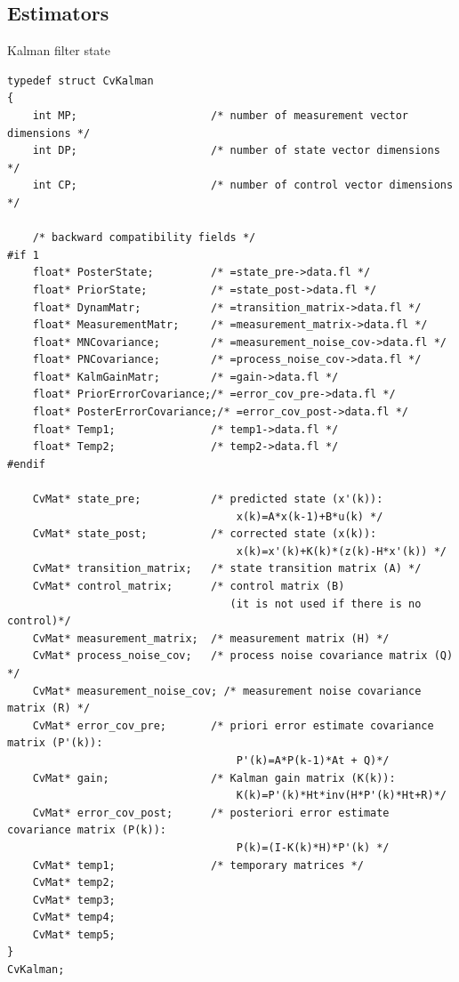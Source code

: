 \subsection{Estimators}

\label{CvKalman}

Kalman filter state

\begin{lstlisting}
typedef struct CvKalman
{
    int MP;                     /* number of measurement vector dimensions */
    int DP;                     /* number of state vector dimensions */
    int CP;                     /* number of control vector dimensions */

    /* backward compatibility fields */
#if 1
    float* PosterState;         /* =state_pre->data.fl */
    float* PriorState;          /* =state_post->data.fl */
    float* DynamMatr;           /* =transition_matrix->data.fl */
    float* MeasurementMatr;     /* =measurement_matrix->data.fl */
    float* MNCovariance;        /* =measurement_noise_cov->data.fl */
    float* PNCovariance;        /* =process_noise_cov->data.fl */
    float* KalmGainMatr;        /* =gain->data.fl */
    float* PriorErrorCovariance;/* =error_cov_pre->data.fl */
    float* PosterErrorCovariance;/* =error_cov_post->data.fl */
    float* Temp1;               /* temp1->data.fl */
    float* Temp2;               /* temp2->data.fl */
#endif

    CvMat* state_pre;           /* predicted state (x'(k)):
                                    x(k)=A*x(k-1)+B*u(k) */
    CvMat* state_post;          /* corrected state (x(k)):
                                    x(k)=x'(k)+K(k)*(z(k)-H*x'(k)) */
    CvMat* transition_matrix;   /* state transition matrix (A) */
    CvMat* control_matrix;      /* control matrix (B)
                                   (it is not used if there is no control)*/
    CvMat* measurement_matrix;  /* measurement matrix (H) */
    CvMat* process_noise_cov;   /* process noise covariance matrix (Q) */
    CvMat* measurement_noise_cov; /* measurement noise covariance matrix (R) */
    CvMat* error_cov_pre;       /* priori error estimate covariance matrix (P'(k)):
                                    P'(k)=A*P(k-1)*At + Q)*/
    CvMat* gain;                /* Kalman gain matrix (K(k)):
                                    K(k)=P'(k)*Ht*inv(H*P'(k)*Ht+R)*/
    CvMat* error_cov_post;      /* posteriori error estimate covariance matrix (P(k)):
                                    P(k)=(I-K(k)*H)*P'(k) */
    CvMat* temp1;               /* temporary matrices */
    CvMat* temp2;
    CvMat* temp3;
    CvMat* temp4;
    CvMat* temp5;
}
CvKalman;
\end{lstlisting}

